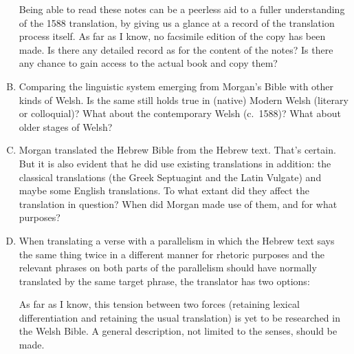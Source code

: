 \begin{enumerate}[A.]
		Being able to read these notes can be a peerless aid to a fuller understanding of the 1588 translation, by giving us a glance at a record of the translation process itself. As far as I know, no facsimile edition of the copy has been made. Is there any detailed record as for the content of the notes? Is there any chance to gain access to the actual book and copy them?

	\item Comparing the linguistic system emerging from Morgan’s Bible with other kinds of Welsh. Is the same still holds true in (native) Modern Welsh (literary or colloquial)? What about the contemporary Welsh (c.~1588)? What about older stages of Welsh?

	\item Morgan translated the Hebrew Bible from the Hebrew text. That’s certain. But it is also evident that he did use existing translations in addition: the classical translations (the Greek Septuagint and the Latin Vulgate) and maybe some English translations. To what extant did they affect the translation in question? When did Morgan made use of them, and for what purposes?

	\item When translating a verse with a parallelism in which the Hebrew text says the same thing twice in a different manner for rhetoric purposes and the relevant phrases on both parts of the parallelism should have normally translated by the same target phrase, the translator has two options:
		As far as I know, this tension between two forces (retaining lexical differentiation and retaining the usual translation) is yet to be researched in the Welsh Bible. A general description, not limited to the senses, should be made.
\end{enumerate}

